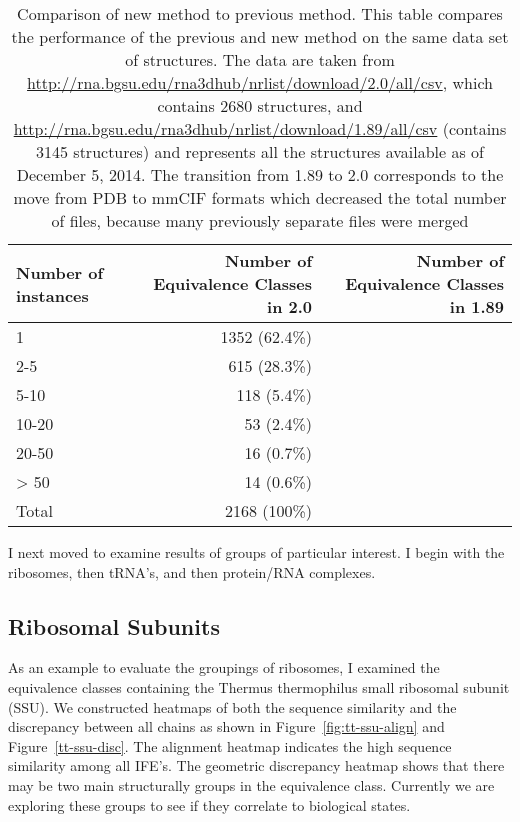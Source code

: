 \begin{table}
  \begin{tabular}{lrr}
    \toprule
    Number of instances & Number of Equivalence Classes in 2.0 & Number of
    Equivalence Classes in 1.89 \\
    \midrule
    1 & 1352 (62.4\%) \\
    2-5 & 615 (28.3\%) \\
    5-10 & 118 (5.4\%) \\
    10-20 & 53 (2.4\%) \\
    20-50 & 16 (0.7\%) \\
    > 50 & 14 (0.6\%)\\
    Total & 2168 (100\%) \\
    \bottomrule
  \end{tabular}
  \caption{Comparison of new method to previous method. This table compares the
  performance of the previous and new method on the same data set of structures.
The data are taken from
\url{http://rna.bgsu.edu/rna3dhub/nrlist/download/2.0/all/csv}, which contains 2680
structures, and \url{http://rna.bgsu.edu/rna3dhub/nrlist/download/1.89/all/csv}
(contains 3145 structures) and represents all the structures available as of
December 5, 2014. The transition from 1.89 to 2.0 corresponds to the move from
PDB to mmCIF formats which decreased the total number of files, because many
previously separate files were merged}
  \label{tab:eq-size-dist}
\end{table}

I next moved to examine results of groups of particular interest. I begin with
the ribosomes, then tRNA’s, and then protein/RNA complexes. 

\subsection{Ribosomal Subunits}

As an example to evaluate the groupings of ribosomes, I examined the equivalence
classes containing the Thermus thermophilus small ribosomal subunit (SSU). We
constructed heatmaps of both the sequence similarity and the discrepancy between
all chains as shown in Figure~\ref{fig:tt-ssu-align} and
Figure~\ref{tt-ssu-disc}. The alignment heatmap indicates the high sequence
similarity among all IFE’s. The geometric discrepancy heatmap shows that there
may be two main structurally groups in the equivalence class. Currently we are
exploring these groups to see if they correlate to biological states. 

